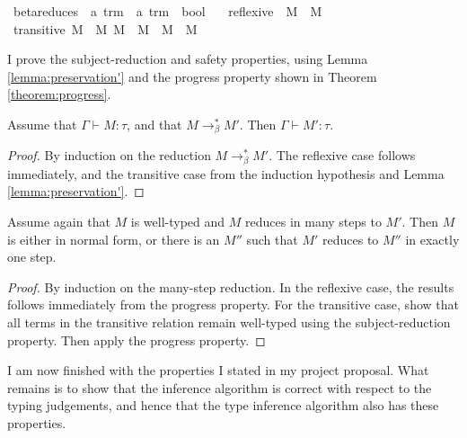 \begin{implementation}
\isamarkupfalse%
\ beta{\isacharunderscore}reduces\ {\isacharcolon}{\isacharcolon}\ {\isachardoublequoteopen}{\isacharprime}a\ trm\ {\isasymRightarrow}\ {\isacharprime}a\ trm\ {\isasymRightarrow}\ bool{\isachardoublequoteclose}\ \isanewline
\ \ reflexive{\isacharcolon}\ \ {\isachardoublequoteopen}M\ {\isasymrightarrow}{\isasymbeta}\isactrlsup {\isacharasterisk}\ M{\isachardoublequoteclose}\isanewline
{\isacharbar}\ transitive{\isacharcolon}\ {\isachardoublequoteopen}{\isasymlbrakk}M\ {\isasymrightarrow}{\isasymbeta}\isactrlsup {\isacharasterisk}\ M{\isacharprime}{\isacharsemicolon}\ M{\isacharprime}\ {\isasymrightarrow}{\isasymbeta}\ M{\isacharprime}{\isacharprime}{\isasymrbrakk}\ {\isasymLongrightarrow}\ M\ {\isasymrightarrow}{\isasymbeta}\isactrlsup {\isacharasterisk}\ M{\isacharprime}{\isacharprime}{\isachardoublequoteclose}
\end{implementation}

I prove the subject-reduction and safety properties, using Lemma \ref{lemma:preservation'} and the progress property shown in Theorem \ref{theorem:progress}.

\begin{theorem}
Assume that \(\Gamma \vdash M : \tau\), and that \(M \to_\beta^* M'\).
Then \(\Gamma \vdash M' : \tau\).
\end{theorem}
\begin{proof}
By induction on the reduction \(M \to_\beta^* M'\).
The reflexive case follows immediately, and the transitive case from the induction hypothesis and Lemma \ref{lemma:preservation'}.
\end{proof}

\begin{theorem}
Assume again that \(M\) is well-typed and \(M\) reduces in many steps to \(M'\).
Then \(M\) is either in normal form, or there is an \(M''\) such that \(M'\) reduces to \(M''\) in exactly one step.
\end{theorem}
\begin{proof}
By induction on the many-step reduction.
In the reflexive case, the results follows immediately from the progress property.
For the transitive case, show that all terms in the transitive relation remain well-typed using the subject-reduction property.
Then apply the progress property.
\end{proof}

I am now finished with the properties I stated in my project proposal.
What remains is to show that the inference algorithm is correct with respect to the typing judgements, and hence that the type inference algorithm also has these properties.

